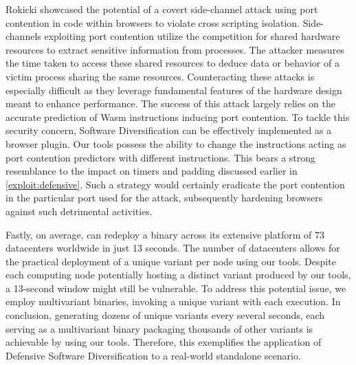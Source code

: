 \begin{strategy}
    Rokicki \etal  \cite{10.1145/3488932.3517411} showcased the potential of a covert side-channel attack using port contention in \Wasm code within browsers to violate cross scripting isolation.
    Side-channels exploiting port contention utilize the competition for shared hardware resources to extract sensitive information from processes. 
    The attacker measures the time taken to access these shared resources to deduce data or behavior of a victim process sharing the same resources. 
    Counteracting these attacks is especially difficult as they leverage fundamental features of the hardware design meant to enhance performance. 
    The success of this attack largely relies on the accurate prediction of Wasm instructions inducing port contention. 
    To tackle this security concern, \Wasm Software Diversification can be effectively implemented as a browser plugin. 
    Our tools possess the ability to change the \Wasm instructions acting as port contention predictors with different instructions. 
    This bears a strong resemblance to the impact on timers and padding discussed earlier in \autoref{exploit:defensive}. 
    Such a strategy would certainly eradicate the port contention in the particular port used for the attack, subsequently hardening browsers against such detrimental activities.

\end{strategy}


\begin{comment}
    
    \wrule{Dataset augmentation:} The \Wasm ecosystem is still in its infancy compared to more mature programming environments. 
    The study by Hilbig \etal  in 2021 found only 8,000 unique \Wasm binaries globally \cite{Hilbig2021AnES}, a fraction of the 1.5 million and 1.7 million packages available in npm and PyPI, respectively. 
    This limited dataset poses challenges for machine learning-based analysis tools, which require extensive data for effective training. 
    The scarcity of \Wasm programs also exacerbates the problem of software monoculture, increasing the risk of compromised \Wasm programs being consumed \cite{usenixWasm2020}. 
\end{comment}

Fastly, on average, can redeploy a \Wasm binary across its extensive platform of 73 datacenters worldwide in just 13 seconds. 
The number of datacenters allows for the practical deployment of a unique variant per node using our tools. 
Despite each computing node potentially hosting a distinct \Wasm variant produced by our tools, a 13-second window might still be vulnerable. 
To address this potential issue, we employ multivariant binaries, invoking a unique variant with each execution. 
In conclusion, generating dozens of unique variants every several seconds, each serving as a multivariant binary packaging thousands of other variants is achievable by using our tools.
Therefore, this exemplifies the application of Defensive Software Diversification to a real-world \Wasm standalone scenario.


